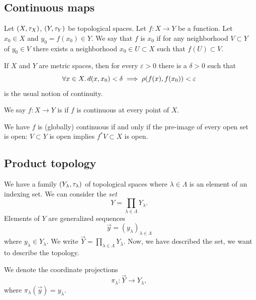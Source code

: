 
\lecture{}

\subsection{Continuous maps}

\begin{definition}
Let $(X,\tau_{X})$, $(Y,\tau_{Y})$ be topological spaces.
Let $f\colon X\to Y$ be a function. Let $x_{0}\in X$ and
$y_{0}=f(x_{0})\in Y$. We say that $f$ is 
$x_{0}$ if for any neighborhood $V\subset Y$ of $y_{0}\in V$ there
exists a neighborhood $x_{0}\in U\subset X$ such that $f(U)\subset V$.
\end{definition}

\begin{example}
If $X$ and $Y$ are metric spaces, then for every $\varepsilon>0$ there
is a $\delta>0$ such that
\begin{equation}
\forall x\in X\ldotp d(x,x_{0})<\delta\implies \rho(f(x),f(x_{0}))<\varepsilon
\end{equation}
is the usual notion of continuity.
\end{example}

\begin{definition}
We say $f\colon X\to Y$ is  if $f$ is continuous at
every point of $X$.
\end{definition}

\begin{theorem}
We have $f$ is (globally) continuous if and only if the pre-image of
every open set is open: $V\subset Y$ is open implies $f^{*}V\subset X$
is open.
\end{theorem}

\subsection{Product topology}

\begin{node}
We have a family $(Y_{\lambda},\tau_{\lambda})$ of topological spaces
where $\lambda\in\Lambda$ is an element of an indexing set. We can
consider the \emph{set}
\begin{equation}
Y=\prod_{\lambda\in\Lambda}Y_{\lambda}.
\end{equation}
Elements of $Y$ are generalized sequences
\begin{equation}
\vec{y}=(y_{\lambda})_{\lambda\in\Lambda}
\end{equation}
where $y_{\lambda}\in Y_{\lambda}$. We write $\vec{Y}=\prod_{\lambda\in\Lambda}Y_{\lambda}$. Now, we have described the set, we
want to describe the topology.

We denote the coordinate projections
\begin{equation}
\pi_{\lambda}\colon\vec{Y}\to Y_{\lambda},
\end{equation}
where $\pi_{\lambda}(\vec{y})=y_{\lambda}$.
\end{node}

